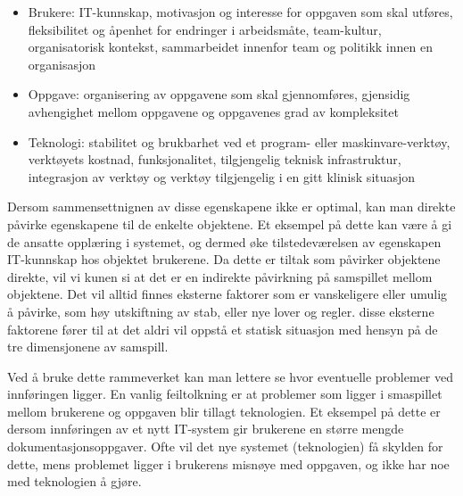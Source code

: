 \begin{itemize}
\item Brukere: IT-kunnskap, motivasjon og interesse for oppgaven som skal utføres, fleksibilitet og åpenhet for endringer i arbeidsmåte, team-kultur, organisatorisk kontekst, sammarbeidet innenfor team og politikk innen en organisasjon
\item Oppgave: organisering av oppgavene som skal gjennomføres, gjensidig avhengighet mellom oppgavene og oppgavenes grad av kompleksitet
\item Teknologi: stabilitet og brukbarhet ved et program- eller maskinvare-verktøy, verktøyets kostnad, funksjonalitet, tilgjengelig teknisk infrastruktur, integrasjon av verktøy og verktøy tilgjengelig i en gitt klinisk situasjon
\end{itemize}

\noindent
Dersom sammensettnignen av disse egenskapene ikke er optimal, kan man direkte påvirke egenskapene til de enkelte objektene. Et eksempel på dette kan være å gi de ansatte opplæring i systemet, og dermed øke tilstedeværelsen av egenskapen IT-kunnskap hos objektet brukerene. Da dette er tiltak som påvirker objektene direkte, vil vi kunen si at det er en indirekte påvirkning på samspillet mellom objektene.
Det vil alltid finnes eksterne faktorer som er vanskeligere eller umulig å påvirke, som høy utskiftning av stab, eller nye lover og regler. disse eksterne faktorene fører til at det aldri vil oppstå et statisk situasjon med hensyn på de tre dimensjonene av samspill. 

\noindent
Ved å bruke dette rammeverket kan man lettere se hvor eventuelle problemer ved innføringen ligger. En vanlig feiltolkning er at problemer som ligger i smaspillet mellom brukerene og oppgaven blir tillagt teknologien. Et eksempel på dette er dersom innføringen av et nytt IT-system gir brukerene en større mengde dokumentasjonsoppgaver. Ofte vil det nye systemet (teknologien) få skylden for dette, mens problemet ligger i brukerens misnøye med oppgaven, og ikke har noe med teknologien å gjøre.

